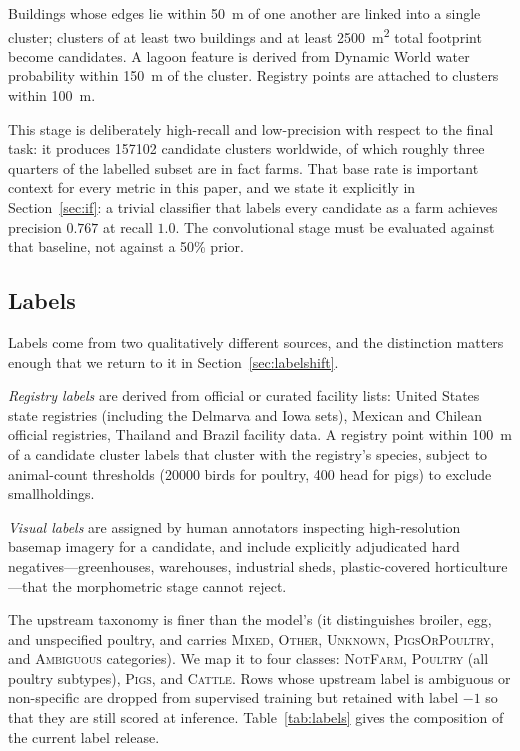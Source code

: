 \documentclass[11pt,a4paper]{article}
\begin{document}
Buildings whose edges lie within \SI{50}{\metre} of one another are linked into
a single cluster; clusters of at least two buildings and at least
\SI{2500}{\metre\squared} total footprint become candidates. A lagoon feature is
derived from Dynamic World \citep{brown2022dynamicworld} water probability
within \SI{150}{\metre} of the cluster. Registry points are attached to clusters
within \SI{100}{\metre}.

This stage is deliberately high-recall and low-precision with respect to the
final task: it produces \num{157102} candidate clusters worldwide, of which
roughly three quarters of the labelled subset are in fact farms. That base rate
is important context for every metric in this paper, and we state it explicitly
in Section~\ref{sec:if}: a trivial classifier that labels every candidate as a
farm achieves precision $0.767$ at recall $1.0$. The convolutional stage must be
evaluated against that baseline, not against a 50\% prior.

\subsection{Labels}
\label{sec:labels}

Labels come from two qualitatively different sources, and the distinction
matters enough that we return to it in Section~\ref{sec:labelshift}.

\emph{Registry labels} are derived from official or curated facility lists:
United States state registries (including the Delmarva and Iowa sets), Mexican
and Chilean official registries, Thailand and Brazil facility data. A registry
point within \SI{100}{\metre} of a candidate cluster labels that cluster with
the registry's species, subject to animal-count thresholds (\num{20000} birds
for poultry, 400 head for pigs) to exclude smallholdings.

\emph{Visual labels} are assigned by human annotators inspecting high-resolution
basemap imagery for a candidate, and include explicitly adjudicated hard
negatives---greenhouses, warehouses, industrial sheds, plastic-covered
horticulture---that the morphometric stage cannot reject.

The upstream taxonomy is finer than the model's (it distinguishes broiler, egg,
and unspecified poultry, and carries \textsc{Mixed}, \textsc{Other},
\textsc{Unknown}, \textsc{PigsOrPoultry}, and \textsc{Ambiguous} categories). We
map it to four classes: \textsc{NotFarm}, \textsc{Poultry} (all poultry
subtypes), \textsc{Pigs}, and \textsc{Cattle}. Rows whose upstream label is
ambiguous or non-specific are dropped from supervised training but retained with
label $-1$ so that they are still scored at inference. Table~\ref{tab:labels}
gives the composition of the current label release.
\end{document}
